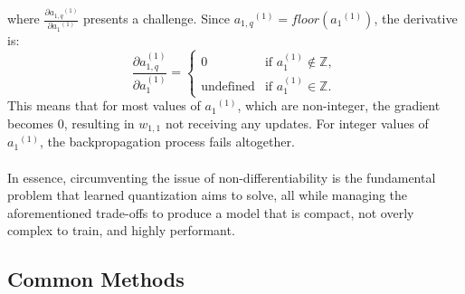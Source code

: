   \noindent where \( \frac{\partial {a_{1,q}}^{(1)}}{\partial {a_1}^{(1)}} \) presents a challenge. 
  Since \(  {a_{1,q}}^{(1)} =  floor({a_1}^{(1)}) \), the derivative is: 
            \[
            \frac{\partial a_{1,q}^{(1)}}{\partial a_{1}^{(1)}} =
            \begin{cases} 
                0 & \text{if } a_{1}^{(1)} \notin \mathbb{Z}, \\
                \text{undefined} & \text{if } a_{1}^{(1)} \in \mathbb{Z}.
            \end{cases}
            \]
  This means that for most values of \( {a_1}^{(1)} \), which are non-integer, the gradient becomes $0$, resulting in 
  $w_{1,1}$ not receiving any updates. For integer values of \( {a_1}^{(1)} \), the backpropagation process fails altogether.
\\
\\
In essence, circumventing the issue of non-differentiability is the fundamental problem that learned quantization aims to solve,
all while managing the aforementioned trade-offs to produce a model that is compact, not overly complex to train,
and highly performant.


\subsection{Common Methods}
\label{subsec:commonlearnedquantizationmethods}

